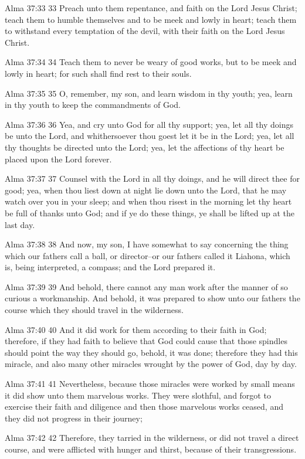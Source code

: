 Alma 37:33
 33 Preach unto them repentance, and faith on the Lord Jesus
Christ; teach them to humble themselves and to be meek and lowly
in heart; teach them to withstand every temptation of the devil,
with their faith on the Lord Jesus Christ.

Alma 37:34
 34 Teach them to never be weary of good works, but to be meek
and lowly in heart; for such shall find rest to their souls.

Alma 37:35
 35 O, remember, my son, and learn wisdom in thy youth; yea,
learn in thy youth to keep the commandments of God.

Alma 37:36
 36 Yea, and cry unto God for all thy support; yea, let all thy
doings be unto the Lord, and whithersoever thou goest let it be
in the Lord; yea, let all thy thoughts be directed unto the Lord;
yea, let the affections of thy heart be placed upon the Lord
forever.

Alma 37:37
 37 Counsel with the Lord in all thy doings, and he will direct
thee for good; yea, when thou liest down at night lie down unto
the Lord, that he may watch over you in your sleep; and when thou
risest in the morning let thy heart be full of thanks unto God;
and if ye do these things, ye shall be lifted up at the last day.

Alma 37:38
 38 And now, my son, I have somewhat to say concerning the thing
which our fathers call a ball, or director--or our fathers called
it Liahona, which is, being interpreted, a compass; and the Lord
prepared it.

Alma 37:39
 39 And behold, there cannot any man work after the manner of so
curious a workmanship. And behold, it was prepared to show unto
our fathers the course which they should travel in the
wilderness.

Alma 37:40
 40 And it did work for them according to their faith in God;
therefore, if they had faith to believe that God could cause that
those spindles should point the way they should go, behold, it
was done; therefore they had this miracle, and also many other
miracles wrought by the power of God, day by day.

Alma 37:41
 41 Nevertheless, because those miracles were worked by small
means it did show unto them marvelous works. They were slothful,
and forgot to exercise their faith and diligence and then those
marvelous works ceased, and they did not progress in their
journey;

Alma 37:42
 42 Therefore, they tarried in the wilderness, or did not travel
a direct course, and were afflicted with hunger and thirst,
because of their transgressions.

